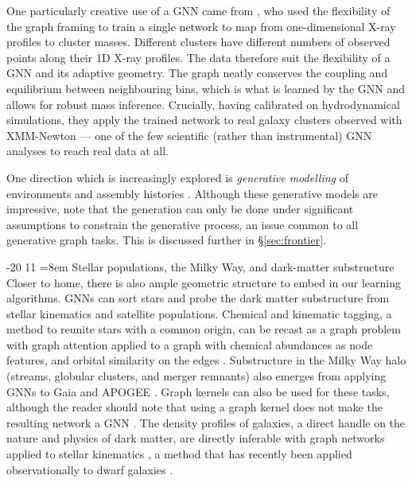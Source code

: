 \documentclass[graybox, envcountchap]{Template/svmult}
\makeatletter
\renewcommand\subsection{\@startsection{subsection}{2}{\z@}%
                       {-20\p@}%
                       {11\p@}%
                       {\normalfont\subsecsize\subsecstyle
                        \rightskip=\z@ \@plus 8em\pretolerance=10000 }}
\makeatother
\begin{document}
One particularly creative use of a GNN came from \citet{Iqbal2025_cluster_xray_GNN}, who used the flexibility of the graph framing to train a single network to map from one-dimensional X-ray profiles to cluster masses. Different clusters have different numbers of observed points along their 1D X-ray profiles. The data therefore suit the flexibility of a GNN and its adaptive geometry. The graph neatly conserves the coupling and equilibrium between neighbouring bins, which is what is learned by the GNN and allows for robust mass inference. Crucially, having calibrated on hydrodynamical simulations, they apply the trained network to real galaxy clusters observed with XMM-Newton --- one of the few scientific (rather than instrumental) GNN analyses to reach real data at all.

One direction which is increasingly explored is \textit{generative modelling} of environments \citep{Nguyen2026_DREAMS_diffusion} and assembly histories \citep{Tang2022_merger_normalizingflow, Nguyen2024_FLORAH_assembly, Nguyen2025_mergertree_generative}. Although these generative models are impressive, note that the generation can only be done under significant assumptions to constrain the generative process, an issue common to all generative graph tasks. This is discussed further in \S\ref{sec:frontier}.

\subsection{Stellar populations, the Milky Way, and dark-matter substructure}
\label{subsec:app-stellar}
Closer to home, there is also ample geometric structure to embed in our learning algorithms. GNNs can sort stars and probe the dark matter substructure from stellar kinematics and satellite populations. Chemical and kinematic tagging, a method to reunite stars with a common origin, can be recast as a graph problem with graph attention applied to a graph with chemical abundances as node features, and orbital similarity on the edges \citep{Spina2025_chemicaltagging_GAT}. Substructure in the Milky Way halo (streams, globular clusters, and merger remnants) also emerges from applying GNNs to Gaia and APOGEE \citep{Berni2025_MWhalo_substructure}. Graph kernels can also be used for these tasks, although the reader should note that using a graph kernel does not make the resulting network a GNN \citep{Ting2023_WLkernel_chemicaltagging}. The density profiles of galaxies, a direct handle on the nature and physics of dark matter, are directly inferable with graph networks applied to stellar kinematics \citep{Nguyen2023_dwarf_densityprofile, Nguyen2025_dwarf_GraphNPE}, a method that has recently been applied observationally to dwarf galaxies \citep{Nguyen2026graphNPE_applied}.
\end{document}

